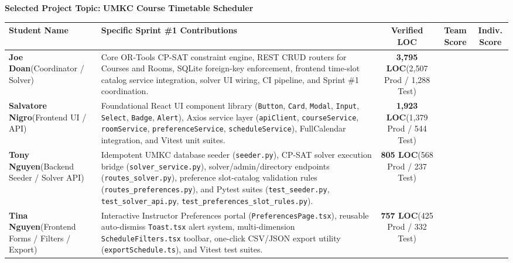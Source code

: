 \documentclass[10pt,letterpaper]{article}
\begin{document}
\vspace{0.3em}
\noindent\textbf{Selected Project Topic:} {\large\textbf{\color{umkcblue}UMKC Course Timetable Scheduler}}

\vspace{0.3em}
\renewcommand{\arraystretch}{1.25}
\noindent
\begin{tabularx}{\textwidth}{|p{2.9cm}|X|c|c|c|}
\hline
\rowcolor{tableheader}
\textbf{\sffamily Student Name} & \textbf{\sffamily Specific Sprint \#1 Contributions} & \textbf{\sffamily Verified LOC} & \textbf{\sffamily Team Score} & \textbf{\sffamily Indiv. Score} \\ \hline
\textbf{Joe Doan}\newline\footnotesize(Coordinator / Solver) & Core OR-Tools CP-SAT constraint engine, REST CRUD routers for Courses and Rooms, SQLite foreign-key enforcement, frontend time-slot catalog service integration, solver UI wiring, CI pipeline, and Sprint \#1 coordination. & \textbf{3,795 LOC}\newline\footnotesize(2,507 Prod / 1,288 Test) & & \\ \hline
\textbf{Salvatore Nigro}\newline\footnotesize(Frontend UI / API) & Foundational React UI component library (\texttt{Button}, \texttt{Card}, \texttt{Modal}, \texttt{Input}, \texttt{Select}, \texttt{Badge}, \texttt{Alert}), Axios service layer (\texttt{apiClient}, \texttt{courseService}, \texttt{roomService}, \texttt{preferenceService}, \texttt{scheduleService}), FullCalendar integration, and Vitest unit suites. & \textbf{1,923 LOC}\newline\footnotesize(1,379 Prod / 544 Test) & & \\ \hline
\textbf{Tony Nguyen}\newline\footnotesize(Backend Seeder / Solver API) & Idempotent UMKC database seeder (\texttt{seeder.py}), CP-SAT solver execution bridge (\texttt{solver\_service.py}), solver/admin/directory endpoints (\texttt{routes\_solver.py}), preference slot-catalog validation rules (\texttt{routes\_preferences.py}), and Pytest suites (\texttt{test\_seeder.py}, \texttt{test\_solver\_api.py}, \texttt{test\_preferences\_slot\_rules.py}). & \textbf{805 LOC}\newline\footnotesize(568 Prod / 237 Test) & & \\ \hline
\textbf{Tina Nguyen}\newline\footnotesize(Frontend Forms / Filters / Export) & Interactive Instructor Preferences portal (\texttt{PreferencesPage.tsx}), reusable auto-dismiss \texttt{Toast.tsx} alert system, multi-dimension \texttt{ScheduleFilters.tsx} toolbar, one-click CSV/JSON export utility (\texttt{exportSchedule.ts}), and Vitest test suites. & \textbf{757 LOC}\newline\footnotesize(425 Prod / 332 Test) & & \\ \hline
\end{tabularx}
\end{document}
